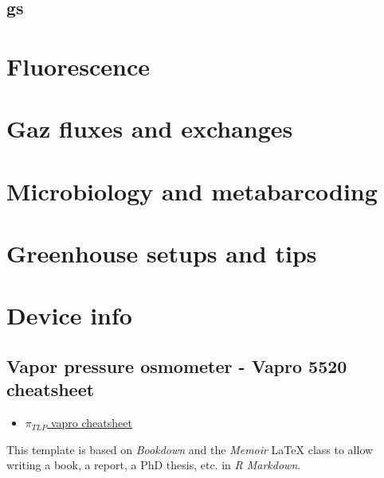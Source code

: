 \documentclass[
  12pt,
  american,
  a4paper,
  extrafontsizes,onecolumn,openright
  ]{memoir}
\providecommand{\tightlist}{%
  \setlength{\itemsep}{0pt}\setlength{\parskip}{0pt}}
\begin{document}
\hypertarget{gs}{%
\section{gs}\label{gs}}

\hypertarget{fluorescence}{%
\chapter{Fluorescence}\label{fluorescence}}

\hypertarget{gaz-fluxes-and-exchanges}{%
\chapter{Gaz fluxes and exchanges}\label{gaz-fluxes-and-exchanges}}

\hypertarget{microbiology-and-metabarcoding}{%
\chapter{Microbiology and metabarcoding}\label{microbiology-and-metabarcoding}}

\hypertarget{greenhouse-setups-and-tips}{%
\chapter{Greenhouse setups and tips}\label{greenhouse-setups-and-tips}}

\hypertarget{device-info}{%
\chapter{Device info}\label{device-info}}

\hypertarget{vapor-pressure-osmometer---vapro-5520-cheatsheet}{%
\section{Vapor pressure osmometer - Vapro 5520 cheatsheet}\label{vapor-pressure-osmometer---vapro-5520-cheatsheet}}

\begin{itemize}
\tightlist
\item
  \href{./document/machine/Vapro\%205520/Vapro_cheatsheet.pdf}{\textbf{\(\pi_{TLP}\)} vapro cheatsheet}
\end{itemize}

This template is based on \emph{Bookdown} and the \emph{Memoir} LaTeX class to allow writing a book, a report, a PhD thesis, etc. in \emph{R Markdown}.
\end{document}
